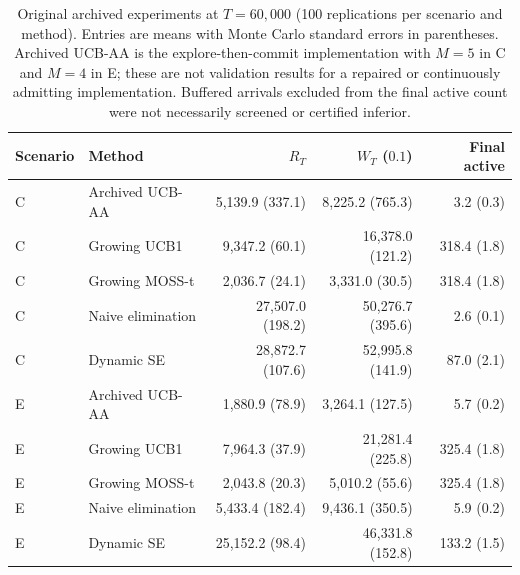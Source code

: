 \begin{table}[tbp]
\centering
\small
\caption{Original archived experiments at $T=60{,}000$ (100 replications per scenario and method). Entries are means with Monte Carlo standard errors in parentheses. Archived UCB-AA is the explore-then-commit implementation with $M=5$ in C and $M=4$ in E; these are not validation results for a repaired or continuously admitting implementation. Buffered arrivals excluded from the final active count were not necessarily screened or certified inferior.}
\label{tab:original-archive}
\begin{tabular}{llrrr}
\toprule
Scenario & Method & $R_T$ & $W_T$ ($0.1$) & Final active \\
\midrule
C & Archived UCB-AA & 5,139.9 (337.1) & 8,225.2 (765.3) & 3.2 (0.3) \\
C & Growing UCB1 & 9,347.2 (60.1) & 16,378.0 (121.2) & 318.4 (1.8) \\
C & Growing MOSS-t & 2,036.7 (24.1) & 3,331.0 (30.5) & 318.4 (1.8) \\
C & Naive elimination & 27,507.0 (198.2) & 50,276.7 (395.6) & 2.6 (0.1) \\
C & Dynamic SE & 28,872.7 (107.6) & 52,995.8 (141.9) & 87.0 (2.1) \\
\addlinespace
E & Archived UCB-AA & 1,880.9 (78.9) & 3,264.1 (127.5) & 5.7 (0.2) \\
E & Growing UCB1 & 7,964.3 (37.9) & 21,281.4 (225.8) & 325.4 (1.8) \\
E & Growing MOSS-t & 2,043.8 (20.3) & 5,010.2 (55.6) & 325.4 (1.8) \\
E & Naive elimination & 5,433.4 (182.4) & 9,436.1 (350.5) & 5.9 (0.2) \\
E & Dynamic SE & 25,152.2 (98.4) & 46,331.8 (152.8) & 133.2 (1.5) \\
\bottomrule
\end{tabular}
\end{table}
